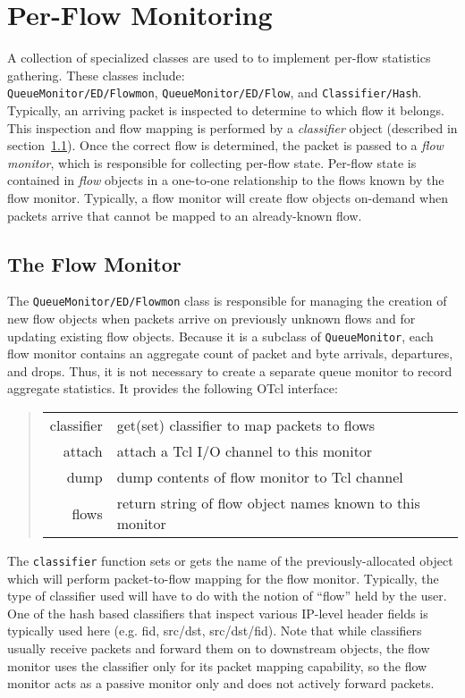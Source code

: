 \section{Per-Flow Monitoring}
\label{sec:flowmon}

A collection of specialized classes are used to to implement
per-flow statistics gathering.
These classes include: \\
{\tt QueueMonitor/ED/Flowmon},
{\tt QueueMonitor/ED/Flow}, and {\tt Classifier/Hash}.
Typically, an arriving packet is inspected to determine
to which flow it belongs.
This inspection and flow mapping is performed by a {\em classifier}
object (described in section~\ref{sec:flowmonitor}).
Once the correct flow is determined, the packet is passed to
a {\em flow monitor}, which is responsible for collecting per-flow
state.
Per-flow state is contained in {\em flow} objects in a one-to-one
relationship to the flows known by the flow monitor.
Typically, a flow monitor will create flow objects on-demand when
packets arrive that cannot be mapped to an already-known flow.

\subsection{The Flow Monitor}
\label{sec:flowmonitor}

The {\tt QueueMonitor/ED/Flowmon} class is responsible for managing
the creation of new flow objects when packets arrive on previously
unknown flows and for updating existing flow objects.
Because it is a subclass of {\tt QueueMonitor}, each flow monitor
contains an aggregate count of packet and byte arrivals, departures, and
drops.
Thus, it is not necessary to create a separate queue monitor to record
aggregate statistics.
It provides the following OTcl interface:
\begin{quote}
\begin{tabularx}{\linewidth}{rX}
         classifier & get(set) classifier to map packets to flows\\
         attach & attach a Tcl I/O channel to this monitor\\
         dump  & dump contents of flow monitor to Tcl channel\\
         flows & return string of flow object names known to this monitor\\
\end{tabularx}
\end{quote}

The {\tt classifier} function sets or gets the name of the previously-allocated
object which will perform packet-to-flow mapping for the flow monitor.
Typically, the type of classifier used will have to do with the notion of
``flow'' held by the user.
One of the hash based classifiers that inspect various IP-level header
fields is typically used here (e.g. fid, src/dst, src/dst/fid).
Note that while classifiers usually receive packets and forward them
on to downstream objects, the flow monitor uses the classifier only for
its packet mapping capability, so the flow monitor acts as a passive
monitor only and does not actively forward packets.

